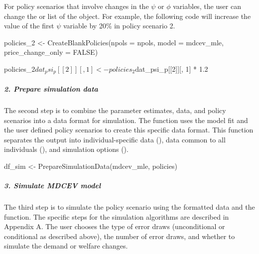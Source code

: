 \begin{Schunk}
\end{Schunk}

For policy scenarios that involve changes in the \(\psi\) or \(\phi\)
variables, the user can change the  or 
list of the  object. For example, the following code will
increase the value of the first \(\psi\) variable by 20\% in policy
scenario 2.

\begin{Schunk}
\begin{Sinput}
policies_2 <-  CreateBlankPolicies(npols = npols,
                                model = mdcev_mle,
                                price_change_only = FALSE)

policies_2$dat_psi_p[[2]][, 1] <- policies_2$dat_psi_p[[2]][, 1] * 1.2
\end{Sinput}
\end{Schunk}

\hypertarget{prepare-simulation-data}{%
\subparagraph{2. Prepare simulation
data}\label{prepare-simulation-data}}

The second step is to combine the parameter estimates, data, and policy
scenarios into a data format for simulation. The
 function uses the model fit and the user
defined policy scenarios to create this specific data format. This
function separates the output into individual-specific data
(), data common to all individuals (),
and simulation options ().

\begin{Schunk}
\begin{Sinput}
df_sim <- PrepareSimulationData(mdcev_mle, policies)
\end{Sinput}
\end{Schunk}

\hypertarget{simulate-mdcev-model}{%
\subparagraph{3. Simulate MDCEV model}\label{simulate-mdcev-model}}

The third step is to simulate the policy scenario using the formatted
data and the  function. The specific steps for the
simulation algorithms are described in Appendix A. The user chooses the
type of error draws (unconditional or conditional as described above),
the number of error draws, and whether to simulate the demand or welfare
changes.

